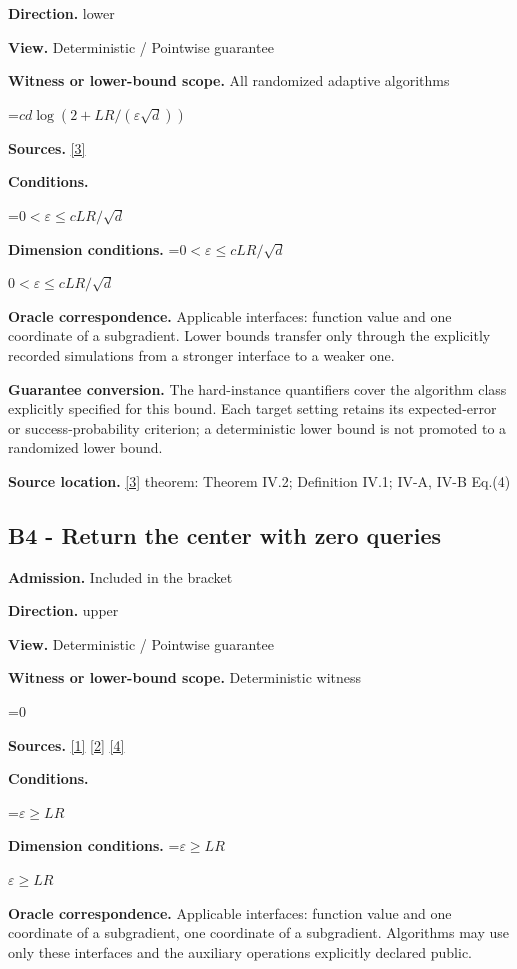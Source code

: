 \documentclass[10pt,a4paper]{article}
\newcommand{\AtlasMath}[1]{\par\begingroup\centering\setbox0=\hbox{$\displaystyle #1$}\ifdim\wd0>1.4\linewidth\typeout{ATLAS WIDE FORMULA: \the\wd0}\fi\ifdim\wd0>\linewidth\resizebox{\linewidth}{!}{\box0}\else\box0\fi\par\endgroup}
\newcommand{\AtlasInlineMath}[1]{\begingroup\setbox0=\hbox{$#1$}\ifdim\wd0>.4\linewidth\endgroup\AtlasMath{#1}\else\endgroup$#1$\fi}
\begin{document}
\textbf{Direction.} lower

\textbf{View.} Deterministic / Pointwise guarantee

\textbf{Witness or lower-bound scope.} All randomized adaptive algorithms

\AtlasMath{cd\log(2+LR/(\varepsilon\sqrt d))}
\textbf{Sources.} \href{https://arxiv.org/pdf/1407.5144}{[3]}

\textbf{Conditions.} 
\AtlasMath{0<\varepsilon\le cLR/\sqrt d}


\textbf{Dimension conditions.} \AtlasInlineMath{0<\varepsilon\le cLR/\sqrt d}

\textbf{Oracle correspondence.} Applicable interfaces: function value and one coordinate of a subgradient. Lower bounds transfer only through the explicitly recorded simulations from a stronger interface to a weaker one.

\textbf{Guarantee conversion.} The hard-instance quantifiers cover the algorithm class explicitly specified for this bound. Each target setting retains its expected-error or success-probability criterion; a deterministic lower bound is not promoted to a randomized lower bound.

\textbf{Source location.} \href{https://arxiv.org/pdf/1407.5144}{[3]} theorem: Theorem IV.2; Definition IV.1; IV-A, IV-B Eq.(4)

\subsection{B4 - Return the center with zero queries}
\textbf{Admission.} Included in the bracket

\textbf{Direction.} upper

\textbf{View.} Deterministic / Pointwise guarantee

\textbf{Witness or lower-bound scope.} Deterministic witness

\AtlasMath{0}
\textbf{Sources.} \href{https://arxiv.org/pdf/1405.4980}{[1]} \href{https://www2.isye.gatech.edu/~nemirovs/MOR_AccuracyCertificates.pdf}{[2]} \href{https://arxiv.org/pdf/2609.20701}{[4]}

\textbf{Conditions.} 
\AtlasMath{\varepsilon\ge LR}


\textbf{Dimension conditions.} \AtlasInlineMath{\varepsilon\ge LR}

\textbf{Oracle correspondence.} Applicable interfaces: function value and one coordinate of a subgradient, one coordinate of a subgradient. Algorithms may use only these interfaces and the auxiliary operations explicitly declared public.
\end{document}
